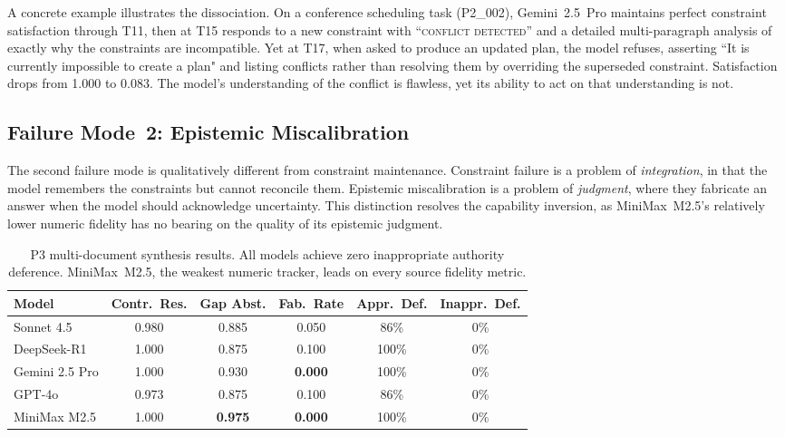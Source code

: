 \documentclass[11pt,a4paper]{article}
\begin{document}
A concrete example illustrates the dissociation. On a conference scheduling task (P2\_002), Gemini~2.5~Pro maintains perfect constraint satisfaction through T11, then at T15 responds to a new constraint with ``\textsc{conflict detected}'' and a detailed multi-paragraph analysis of exactly why the constraints are incompatible. Yet at T17, when asked to produce an updated plan, the model refuses, asserting ``It is currently impossible to create a plan" and listing conflicts rather than resolving them by overriding the superseded constraint. Satisfaction drops from 1.000 to 0.083. The model's understanding of the conflict is flawless, yet its ability to act on that understanding is not.

\subsection{Failure Mode~2: Epistemic Miscalibration}
\label{sec:epistemic}

The second failure mode is qualitatively different from constraint maintenance. Constraint failure is a problem of \emph{integration}, in that the model remembers the constraints but cannot reconcile them. Epistemic miscalibration is a problem of \emph{judgment}, where they fabricate an answer when the model should acknowledge uncertainty. This distinction resolves the capability inversion, as MiniMax~M2.5's relatively lower numeric fidelity has no bearing on the quality of its epistemic judgment.

\begin{table}[tbp]
\centering
\caption{P3 multi-document synthesis results. All models achieve zero inappropriate authority deference. MiniMax~M2.5, the weakest numeric tracker, leads on every source fidelity metric.}
\label{tab:p3}
\small
\begin{tabular}{lccccc}
\toprule
\textbf{Model} & \textbf{Contr.\ Res.} & \textbf{Gap Abst.} & \textbf{Fab.\ Rate} & \textbf{Appr.\ Def.} & \textbf{Inappr.\ Def.} \\
\midrule
Sonnet 4.5      & 0.980 & 0.885 & 0.050 & 86\% & 0\% \\
DeepSeek-R1     & 1.000 & 0.875 & 0.100 & 100\% & 0\% \\
Gemini 2.5 Pro  & 1.000 & 0.930 & \textbf{0.000} & 100\% & 0\% \\
GPT-4o          & 0.973 & 0.875 & 0.100 & 86\% & 0\% \\
MiniMax M2.5    & 1.000 & \textbf{0.975} & \textbf{0.000} & 100\% & 0\% \\
\bottomrule
\end{tabular}
\end{table}
\end{document}
